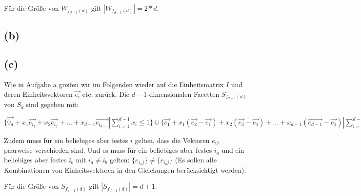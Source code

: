 \documentclass[a4paper]{article}
\begin{document}
Für die Größe von $W_{f_{d-1}(d)}$ gilt $|W_{f_{d-1}(d)}| = 2*d$.

\subsection*{(b)}
\begin{figure}[!htb]
\end{figure} 

\subsection*{(c)}

\begin{figure}[!htb]
\end{figure} 

Wie in Aufgabe a greifen wir im Folgenden wieder auf die Einheitsmatrix $I$ und deren Einheitsvektoren $\vec{e_i}$ etc. zurück.
Die $d-1$-dimensionalen Facetten $S_{f_{d-1}(d)}$ von $S_d$ sind gegeben mit:

$\{\vec{0_d} + x_1\vec{e_{i_1}} +  x_2\vec{e_{i_2}} + \dots  + x_{d-1}\vec{e_{i_{d-1}}} | \sum_{i=1}^{d-1}x_i \leq 1\} \cup 
\{\vec{e_1} + x_1  (\vec{e_2}-\vec{e_1}) + x_2(\vec{e_3}-\vec{e_1}) + \dots + x_{d-1}(\vec{e_{d-1}} - \vec{e_1}) |  \sum_{i=1}^{d-1} x_i \leq 1 \}$

Zudem muss für ein beliebiges aber festes $i$ gelten, dass die Vektoren $e_{ij}$ paarweise
verschieden sind. Und es muss für ein beliebiges aber festes $i_a$ 
und ein beliebiges aber festes $i_b$ mit $i_a \neq i_b$ gelten: 
$\{e_{i_aj}\} \neq \{e_{i_bj}\}$ (Es sollen alle Kombinationen von Einheitsvektoren in den Gleichungen berücksichtigt werden).

Für die Größe von $S_{f_{d-1}(d)}$ gilt $|S_{f_{d-1}(d)}| = d+1$.
\end{document}
